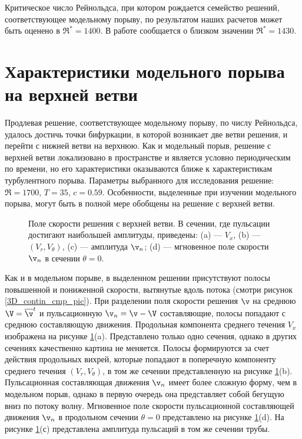 Критическое число Рейнольдса, при котором рождается семейство решений, соответствующее модельному порыву, по результатом наших расчетов может быть оценено в $\Re^* = 1400$. В работе \cite{Avila2013} сообщается о близком значении $\Re^* = 1430$. 


\section{Характеристики модельного порыва на верхней ветви}

Продлевая решение, соответствующее модельному порыву, по числу Рейнольдса, удалось достичь точки бифуркации, в которой возникает две ветви решения, и перейти с нижней ветви на верхнюю. Как и модельный порыв, решение с верхней ветви локализовано в пространстве и является условно периодическим по времени, но его характеристики оказываются ближе к характеристикам турбулентного порыва. Параметры выбранного для исследования решение: $\Re = 1700$, $T = 35$, $c = 0.59$. Особенности, выделенные при изучении модельного порыва, могут быть в полной мере обобщены на решение с верхней ветви. 


\begin{figure}
\caption{Поле скорости решения с верхней ветви. В сечении, где пульсации достигают наибольшей амплитуды, приведены: (a) --- $V_{x}$, (b) --- $(V_{r}, V_{\theta})$, (c) --- амплитуда $\v_n$; (d) --- мгновенное поле скорости $\v_n$ в сечении $\theta = 0$. }
\label{local_ub_means_pic}
\end{figure}


Как и в модельном порыве, в выделенном решении присутствуют полосы повышенной и пониженной скорости, вытянутые вдоль потока (смотри рисунок \ref{3D_contin_cmp_pic}). При разделении поля скорости решения $\v$ на среднюю $\V = \overline{\v}^t$ и пульсационную $\v_n = \v - \V$ составляющие, полосы попадают с среднюю составляющую движения. Продольная компонента среднего течения $V_x$ изображена на рисунке \ref{local_ub_means_pic}(a). Представлено только одно сечения, однако в других сечениях качественно картина не меняется. Полосы формируются за счет действия продольных вихрей, которые попадают в поперечную компоненту среднего течения $(V_r, V_\theta)$, в том же сечении представленную на рисунке \ref{local_ub_means_pic}(b). Пульсационная составляющая движения $\v_n$ имеет более сложную форму, чем в модельном порыв, однако в первую очередь она представляет собой бегущую вниз по потоку волну. Мгновенное поле скорости пульсационной составляющей движения $\v_n$ в продольном сечении $\theta = 0$ представлено на рисунке \ref{local_ub_means_pic}(d). На рисунке \ref{local_ub_means_pic}(с) представлена амплитуда пульсаций в том же сечении трубы. 


